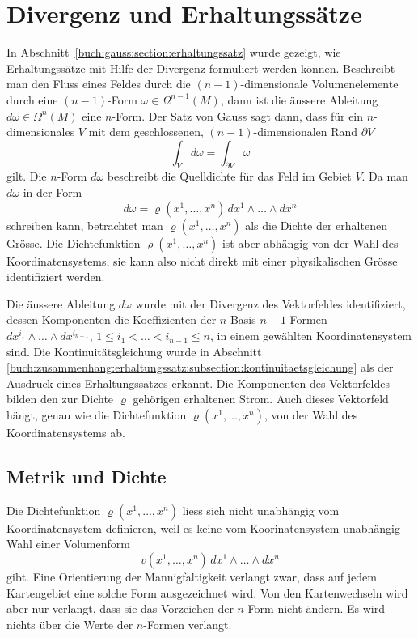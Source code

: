%
%
%

%
%
\section{Divergenz und Erhaltungssätze
\label{buch:zusammenhang:section:divergenz}}
In Abschnitt~\ref{buch:gauss:section:erhaltungssatz} wurde gezeigt,
wie Erhaltungssätze mit Hilfe der Divergenz formuliert werden können.
Beschreibt man den Fluss eines Feldes durch die $(n-1)$-dimensionale
Volumenelemente durch eine $(n-1)$-Form $\omega\in \Omega^{n-1}(M)$,
dann ist die äussere Ableitung $d\omega\in \Omega^n(M)$ eine $n$-Form.
Der Satz von Gauss sagt dann, dass für ein $n$-dimensionales $V$
mit dem geschlossenen, $(n-1)$-dimensionalen Rand $\partial V$
\[
\int_{V}d\omega
=
\int_{\partial V}\omega
\]
gilt.
Die $n$-Form $d\omega$ beschreibt die Quelldichte für das Feld im
Gebiet $V$.
Da man $d\omega$ in der Form
\[
d\omega
=
\varrho(x^1,\dots,x^n)
\,
dx^1\wedge\dots\wedge dx^n
\]
schreiben kann, betrachtet man $\varrho(x^1,\dots,x^n)$ als die
Dichte der erhaltenen Grösse.
Die Dichtefunktion $\varrho(x^1,\dots,x^n)$  ist aber abhängig
von der Wahl des Koordinatensystems, sie kann also nicht direkt 
mit einer physikalischen Grösse identifiziert werden.

Die äussere Ableitung $d\omega$ wurde mit der Divergenz des Vektorfeldes
identifiziert, dessen Komponenten die Koeffizienten der $n$ Basis-$n-1$-Formen
$dx^{i_1}\wedge\dots\wedge dx^{i_{n-1}}$, $1\le i_1<\dots<i_{n-1}\le n$, in
einem gewählten Koordinatensystem sind.
Die Kontinuitätsgleichung wurde in Abschnitt
\ref{buch:zusammenhang:erhaltungssatz:subsection:kontinuitaetsgleichung}
als der Ausdruck eines Erhaltungssatzes erkannt.
Die Komponenten des Vektorfeldes bilden den zur Dichte $\varrho$ gehörigen
erhaltenen Strom.
Auch dieses Vektorfeld hängt, genau wie die Dichtefunktion
$\varrho(x^1,\dots,x^n)$, von der Wahl des Koordinatensystems ab.

%
%
\subsection{Metrik und Dichte
\label{buch:zusammenhang:divergenz:subsection:metrik}}
Die Dichtefunktion $\varrho(x^1,\dots,x^n)$ liess sich nicht 
unabhängig vom Koordinatensystem definieren, weil es keine vom
Koorinatensystem unabhängig Wahl einer Volumenform
\[
v(x^1,\dots,x^n)\,dx^1\wedge\dots\wedge dx^n
\]
gibt.
Eine Orientierung der Mannigfaltigkeit verlangt zwar, dass auf
jedem Kartengebiet eine solche Form ausgezeichnet wird.
Von den Kartenwechseln wird aber nur verlangt, dass sie das Vorzeichen
der $n$-Form nicht ändern.
Es wird nichts über die Werte der $n$-Formen verlangt.

